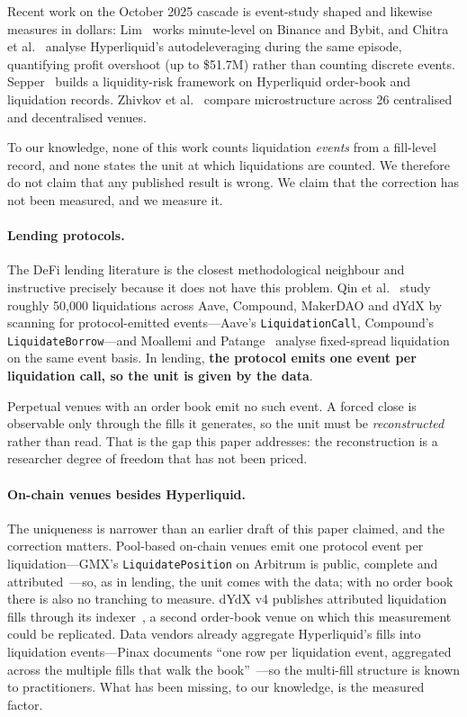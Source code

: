 \documentclass[11pt,a4paper]{article}
\begin{document}
Recent work on the October 2025 cascade is event-study shaped and likewise measures in dollars:
Lim~\cite{lim2026} works minute-level on Binance and Bybit, and Chitra et al.~\cite{chitra2026}
analyse Hyperliquid's autodeleveraging during the same episode, quantifying profit overshoot
(up to \$51.7M) rather than counting discrete events. Sepper~\cite{sepper2026} builds a
liquidity-risk framework on Hyperliquid order-book and liquidation records. Zhivkov et
al.~\cite{zhivkov2026} compare microstructure across 26 centralised and decentralised venues.

To our knowledge, none of this work counts liquidation \emph{events} from a fill-level record, and
none states the unit at which liquidations are counted. We therefore do not claim that any
published result is wrong. We claim that the correction has not been measured, and we measure it.

\paragraph{Lending protocols.} The DeFi lending literature is the closest methodological
neighbour and instructive precisely because it does not have this problem. Qin et
al.~\cite{qin2021} study roughly 50{,}000 liquidations across Aave, Compound, MakerDAO and dYdX
by scanning for protocol-emitted events---Aave's \texttt{LiquidationCall}, Compound's
\texttt{LiquidateBorrow}---and Moallemi and Patange~\cite{moallemi2024} analyse fixed-spread
liquidation on the same event basis. In lending, \textbf{the protocol emits one event per
liquidation call, so the unit is given by the data}.

Perpetual venues with an order book emit no such event. A forced close is observable only
through the fills it generates, so the unit must be \emph{reconstructed} rather than read. That
is the gap this paper addresses: the reconstruction is a researcher degree of freedom that has
not been priced.

\paragraph{On-chain venues besides Hyperliquid.} The uniqueness is narrower than an earlier
draft of this paper claimed, and the correction matters. Pool-based on-chain venues emit one
protocol event per liquidation---GMX's \texttt{LiquidatePosition} on Arbitrum is public,
complete and attributed~\cite{gmx}---so, as in lending, the unit comes with the data; with no
order book there is also no tranching to measure. dYdX v4 publishes attributed liquidation
fills through its indexer~\cite{dydx}, a second order-book venue on which this measurement
could be replicated. Data vendors already aggregate Hyperliquid's fills into liquidation
events---Pinax documents ``one row per liquidation event, aggregated across the multiple fills
that walk the book''~\cite{pinax}---so the multi-fill structure is known to practitioners.
What has been missing, to our knowledge, is the measured factor.
\end{document}
